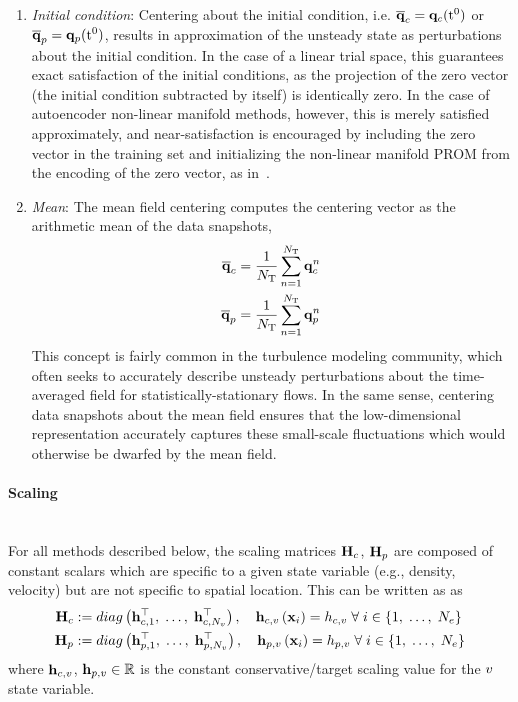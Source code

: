\begin{enumerate}
	\item \textit{Initial condition}: Centering about the initial condition, i.e. $\mathbf{\overline{q}}_{c} = \mathbf{q}_{c}(\text{t}^0)$ or $\mathbf{\overline{q}}_{p} = \mathbf{q}_{p}(\text{t}^0)$, results in approximation of the unsteady state as perturbations about the initial condition. In the case of a linear trial space, this guarantees exact satisfaction of the initial conditions, as the projection of the zero vector (the initial condition subtracted by itself) is identically zero. In the case of autoencoder non-linear manifold methods, however, this is merely satisfied approximately, and near-satisfaction is encouraged by including the zero vector in the training set and initializing the non-linear manifold PROM from the encoding of the zero vector, as in~\cite{Lee2020}.

	\item \textit{Mean}: The mean field centering computes the centering vector as the arithmetic mean of the data snapshots,
	\begin{align}
		\mathbf{\overline{q}}_{c} &= \frac{1}{N_{\text{T}}} \sum_{n=1}^{N_{\text{T}}} \mathbf{q}_{c}^{n} \label{eq:meanCentCons}\\
		\mathbf{\overline{q}}_{p} &= \frac{1}{N_{\text{T}}} \sum_{n=1}^{N_{\text{T}}} \mathbf{q}_{p}^{n} \label{eq:meanCentPrim}
	\end{align}
	This concept is fairly common in the turbulence modeling community, which often seeks to accurately describe unsteady perturbations about the time-averaged field for statistically-stationary flows. In the same sense, centering data snapshots about the mean field ensures that the low-dimensional representation accurately captures these small-scale fluctuations which would otherwise be dwarfed by the mean field.

\end{enumerate}

\paragraph*{Scaling}\mbox{}\\
%
For all methods described below, the scaling matrices $\consScale$, $\primScale$ are composed of constant scalars which are specific to a given state variable (e.g., density, velocity) but are not specific to spatial location. This can be written as as
%
\begin{align}
	\consScale &\defEq diag\left(\consScaleVecVar{1}^\top, \; \hdots, \; \consScaleVecVar{\numVars}^\top \right), \quad \consScaleVecVar{\varIdx}\left(\spatialVec_{\dummyIdx}\right) = \consScaleVar{\varIdx} \; \forall \; \dummyIdx \in \{1, \; \hdots, \; \numCells\} \\
	\primScale &\defEq diag\left(\primScaleVecVar{1}^\top, \; \hdots, \; \primScaleVecVar{\numVars}^\top \right), \quad \primScaleVecVar{\varIdx}\left(\spatialVec_{\dummyIdx}\right) = \primScaleVar{\varIdx} \; \forall \; \dummyIdx \in \{1, \; \hdots, \; \numCells\}
\end{align}
%
where $\mathbf{h}_{c,v}$, $\mathbf{h}_{p,v} \in \mathbb{R}$ is the constant conservative/target scaling value for the $v$ state variable.

